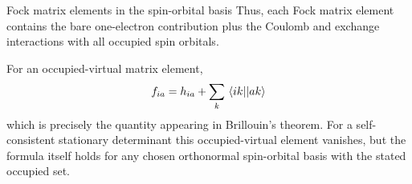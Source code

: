\documentclass[11pt,a4paper,titlepage]{article}
\numberwithin{equation}{section}
\begin{document}
\begin{hfsolution}{Fock matrix elements in the spin-orbital basis}
Thus, each Fock matrix element contains the bare one-electron contribution
plus the Coulomb and exchange interactions with all occupied spin orbitals.

For an occupied-virtual matrix element,
\begin{equation}
  f_{ia}
  =
  h_{ia}
  +
  \sum_k
  \mel{ik}{}{ak}
\end{equation}
which is precisely the quantity appearing in Brillouin's theorem.
For a self-consistent stationary determinant this occupied-virtual element
vanishes, but the formula itself holds for any chosen orthonormal
spin-orbital basis with the stated occupied set.

\end{hfsolution}

\end{document}
